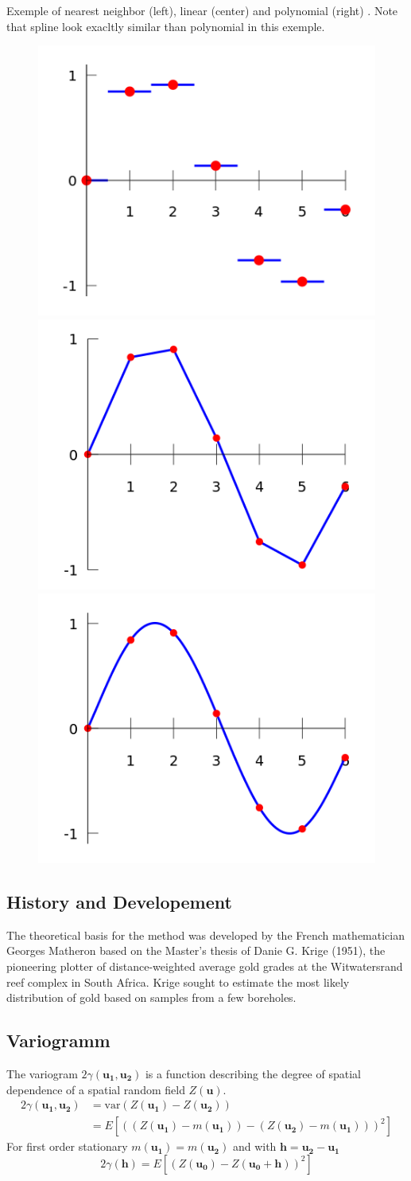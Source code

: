 \documentclass[twocolumn]{article}
\numberwithin{equation}{section}
\begin{document}
Exemple of nearest neighbor (left), linear (center) and polynomial (right) . Note that spline look exacltly similar than polynomial in this exemple.
\begin{figure}[H]
	\centering
	\includegraphics[width=.15\textwidth]{Images/440px-Piecewise_constant.png}
	\includegraphics[width=.15\textwidth]{Images/460px-Interpolation_example_linear.png}
	\includegraphics[width=.15\textwidth]{Images/460px-Interpolation_example_polynomial.png}
\end{figure}

\subsection{History and Developement}
The theoretical basis for the method was developed by the French mathematician Georges Matheron based on the Master's thesis of Danie G. Krige (1951), the pioneering plotter of distance-weighted average gold grades at the Witwatersrand reef complex in South Africa. Krige sought to estimate the most likely distribution of gold based on samples from a few boreholes.


\subsection{Variogramm}
The variogram $2\gamma(\boldsymbol{u_1},\boldsymbol{u_2})$ is a function describing the degree of spatial dependence of a spatial random field $Z(\boldsymbol{u})$.
\begin{align*}
2\gamma(\boldsymbol{u_1},\boldsymbol{u_2}) 	&=\text{var} \left(Z(\boldsymbol{u_1}) - Z(\boldsymbol{u_2})\right) \\
  											&= E\left[((Z(\boldsymbol{u_1})-m(\boldsymbol{u_1}))-(Z(\boldsymbol{u_2}) - m(\boldsymbol{u_1})))^2\right]
\end{align*}
For first order stationary $m(\boldsymbol{u_1})=m(\boldsymbol{u_2})$ and with $\boldsymbol{h}=\boldsymbol{u_2}-\boldsymbol{u_1}$
$$2\gamma(\boldsymbol{h}) =E\left[(Z(\boldsymbol{u_0})-Z(\boldsymbol{u_0+h} ))^2\right]$$
\end{document}
